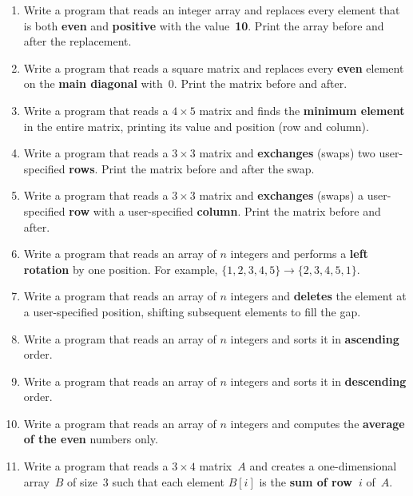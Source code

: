 \begin{enumerate}[leftmargin=*, label=\textbf{Q\arabic*.}]
\item Write a program that reads an integer array and replaces every
      element that is both \textbf{even} and \textbf{positive} with
      the value~\textbf{10}.  Print the array before and after the
      replacement.

\item Write a program that reads a square matrix and replaces every
      \textbf{even} element on the \textbf{main diagonal} with~0.
      Print the matrix before and after.

\item Write a program that reads a $4 \times 5$ matrix and finds the
      \textbf{minimum element} in the entire matrix, printing its value
      and position (row and column).

\item Write a program that reads a $3 \times 3$ matrix and
      \textbf{exchanges} (swaps) two user-specified \textbf{rows}.
      Print the matrix before and after the swap.

\item Write a program that reads a $3 \times 3$ matrix and
      \textbf{exchanges} (swaps) a user-specified \textbf{row} with a
      user-specified \textbf{column}.  Print the matrix before and
      after.

\item Write a program that reads an array of $n$ integers and performs
      a \textbf{left rotation} by one position.  For example,
      $\{1,2,3,4,5\} \rightarrow \{2,3,4,5,1\}$.

\item Write a program that reads an array of $n$ integers and
      \textbf{deletes} the element at a user-specified position,
      shifting subsequent elements to fill the gap.

\item Write a program that reads an array of $n$ integers and sorts it
      in \textbf{ascending} order.

\item Write a program that reads an array of $n$ integers and sorts it
      in \textbf{descending} order.

\item Write a program that reads an array of $n$ integers and computes
      the \textbf{average of the even} numbers only.

\item Write a program that reads a $3 \times 4$ matrix~$A$ and creates
      a one-dimensional array~$B$ of size~3 such that each element
      $B[i]$ is the \textbf{sum of row~$i$} of~$A$.


\end{enumerate}
